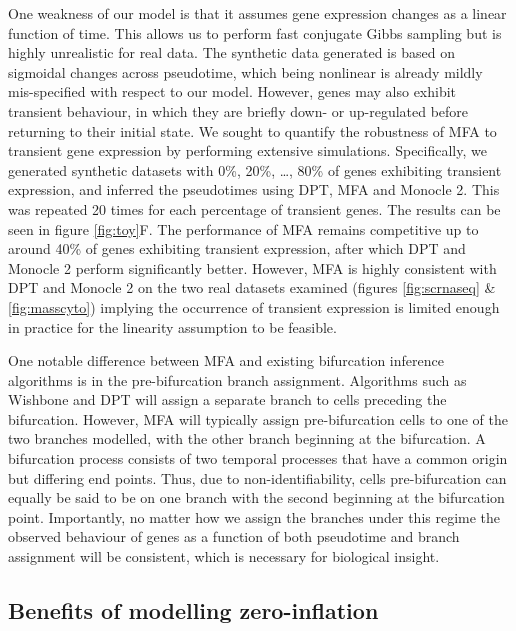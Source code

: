One weakness of our model is that it assumes gene expression changes as a linear function of time. This allows us to perform fast conjugate Gibbs sampling but is highly unrealistic for real data.
The synthetic data generated is based on sigmoidal changes across pseudotime, which being nonlinear is already mildly mis-specified with respect to our model.
However, genes may also exhibit transient behaviour, in which they are briefly down- or up-regulated before returning to their initial state. We sought to quantify the robustness of MFA to transient gene expression by performing extensive simulations. Specifically, we generated synthetic datasets with 0\%, 20\%, \ldots, 80\% of genes exhibiting transient expression, and inferred the pseudotimes using DPT, MFA and Monocle 2. This was repeated 20 times for each percentage of transient genes. The results can be seen in figure \ref{fig:toy}F. The performance of MFA remains competitive up to around 40\% of genes exhibiting transient expression, after which DPT and Monocle 2 perform significantly better. However, MFA is highly consistent with DPT and Monocle 2 on the two real datasets examined (figures \ref{fig:scrnaseq} \& \ref{fig:masscyto}) implying the occurrence of transient expression is limited enough in practice for the linearity assumption to be feasible.

One notable difference between MFA and existing bifurcation inference algorithms is in the pre-bifurcation branch assignment. Algorithms such as Wishbone and DPT will assign a separate branch to cells preceding the bifurcation. However, MFA will typically assign pre-bifurcation cells to one of the two branches modelled, with the other branch beginning at the bifurcation. A bifurcation process consists of two temporal processes that have a common origin but differing end points. Thus, due to non-identifiability, cells pre-bifurcation can equally be said to be on one branch with the second beginning at the bifurcation point. Importantly, no matter how we assign the branches under this regime the observed behaviour of genes as a function of both pseudotime and branch assignment will be consistent, which is necessary for biological insight.

\subsection{Benefits of modelling zero-inflation}

